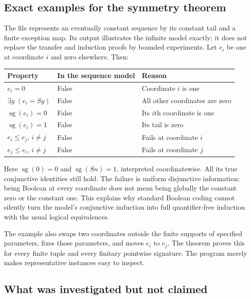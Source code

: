 \subsection{Exact examples for the symmetry theorem}

The file  represents an eventually
constant sequence by its constant tail and a finite exception map.
Its output illustrates the infinite model exactly; it does not replace
the transfer and induction proofs by bounded experiments.
Let $e_i$ be one at coordinate $i$ and zero elsewhere. Then:
\begin{center}
\begin{tabular}{lll}
\toprule
Property & In the sequence model & Reason\\
\midrule
$e_i=0$ & False & Coordinate $i$ is one\\
$\exists y\;(e_i=Sy)$ & False & All other coordinates are zero\\
$\operatorname{sg}(e_i)=0$ & False & Its $i$th coordinate is one\\
$\operatorname{sg}(e_i)=1$ & False & Its tail is zero\\
$e_i\le e_j$, $i\ne j$ & False & Fails at coordinate $i$\\
$e_j\le e_i$, $i\ne j$ & False & Fails at coordinate $j$\\
\bottomrule
\end{tabular}
\end{center}

Here $\operatorname{sg}(0)=0$ and $\operatorname{sg}(Sn)=1$,
interpreted coordinatewise. All its true conjunctive identities still
hold. The failure is uniform disjunctive information: being Boolean
at every coordinate does not mean being globally the constant zero
or the constant one. This explains why standard Boolean coding cannot
silently turn the model's conjunctive induction into full quantifier-free
induction with the usual logical equivalences.

The example also swaps two coordinates outside the finite supports of
specified parameters, fixes those parameters, and moves $e_i$ to $e_j$.
The theorem proves this for every finite tuple and every finitary
pointwise signature. The program merely makes representative instances
easy to inspect.

\subsection{What was investigated but not claimed}

